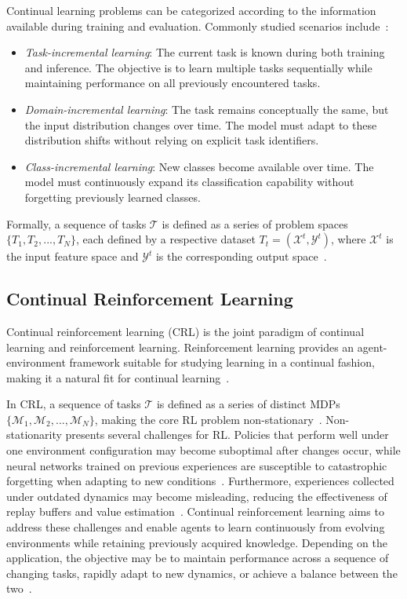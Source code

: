 Continual learning problems can be categorized according to the information available during training and evaluation. Commonly studied scenarios include~\cite{wang2024cl}:
\begin{itemize}
    \item \textit{Task-incremental learning}: The current task is known during both training and inference.
    The objective is to learn multiple tasks sequentially while maintaining performance on all previously encountered tasks.
    \item \textit{Domain-incremental learning}: The task remains conceptually the same, but the input distribution changes over time.
    The model must adapt to these distribution shifts without relying on explicit task identifiers.
    \item \textit{Class-incremental learning}: New classes become available over time.
    The model must continuously expand its classification capability without forgetting previously learned classes.
\end{itemize}
Formally, a sequence of tasks $\mathcal{T}$ is defined as a series of problem spaces $\{ T_1, T_2, ... , T_N \}$, each defined by a respective dataset $T_t = (\mathcal{X}^t, \mathcal{Y}^t)$, where $\mathcal{X}^t$ is the input feature space and $\mathcal{Y}^t$ is the corresponding output space~\cite{khetarpal2022crl,wang2024cl}.

\subsection{Continual Reinforcement Learning} \label{sec:cl:crl}
Continual reinforcement learning (CRL) is the joint paradigm of continual learning and reinforcement learning.
Reinforcement learning provides an agent-environment framework suitable for studying learning in a continual fashion, making it a natural fit for continual learning~\cite{khetarpal2022crl}.

In CRL, a sequence of tasks $\mathcal{T}$ is defined as a series of distinct MDPs $\{ \mathcal{M}_1, \mathcal{M}_2, ... , \mathcal{M}_N \}$, making the core RL problem non-stationary~\cite{puterman1990mdp}.
Non-stationarity presents several challenges for RL.
Policies that perform well under one environment configuration may become suboptimal after changes occur, while neural networks trained on previous experiences are susceptible to catastrophic forgetting when adapting to new conditions~\cite{khetarpal2022crl,wang2024cl}.
Furthermore, experiences collected under outdated dynamics may become misleading, reducing the effectiveness of replay buffers and value estimation~\cite{khetarpal2022crl}.
Continual reinforcement learning aims to address these challenges and enable agents to learn continuously from evolving environments while retaining previously acquired knowledge.
Depending on the application, the objective may be to maintain performance across a sequence of changing tasks, rapidly adapt to new dynamics, or achieve a balance between the two~\cite{khetarpal2022crl}.

